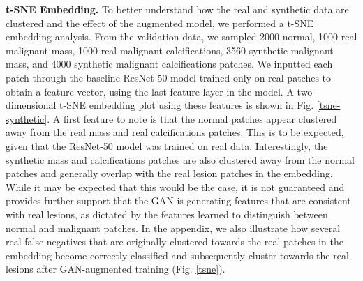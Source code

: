 \documentclass{article}
\begin{document}
\noindent\textbf{t-SNE Embedding.}
To better understand how the real and synthetic data are clustered and the effect of the augmented model, we performed a t-SNE embedding analysis. From the validation data, we sampled 2000 normal, 1000 real malignant mass, 1000 real malignant calcifications, 3560 synthetic malignant mass, and 4000 synthetic malignant calcifications patches. We inputted each patch through the baseline ResNet-50 model trained only on real patches to obtain a feature vector, using the last feature layer in the model.
A two-dimensional t-SNE embedding plot using these features is shown in Fig.  \ref{tsne-synthetic}.
A first feature to note is that the normal patches appear clustered away from the real mass and real calcifications patches. 
This is to be expected, given that the ResNet-50 model was trained on real data. 
Interestingly, the synthetic mass and calcifications patches are also clustered away from the normal patches and generally overlap with the real lesion patches in the embedding.
While it may be expected that this would be the case, it is not guaranteed and provides further support that the GAN is generating features that are consistent with real lesions, as dictated by the features learned to distinguish between normal and malignant patches.
In the appendix, we also illustrate how several real false negatives that are originally clustered towards the real patches in the embedding become correctly classified and subsequently cluster towards the real lesions after GAN-augmented training (Fig. \ref{tsne}).
\end{document}
